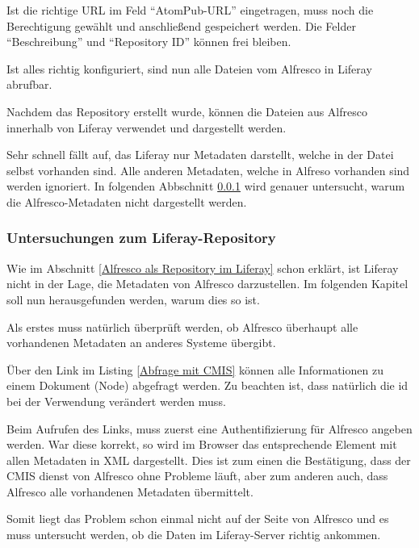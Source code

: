 Ist die richtige URL im Feld "`AtomPub-URL"' eingetragen, muss noch die Berechtigung gew\"ahlt und anschlie\ss{}end gespeichert werden. Die Felder "`Beschreibung"' und "`Repository ID"' k\"onnen frei bleiben.

Ist alles richtig konfiguriert, sind nun alle Dateien vom Alfresco in Liferay abrufbar. \cite{CMIS_Repo}

Nachdem das Repository erstellt wurde, k\"onnen die Dateien aus Alfresco innerhalb von Liferay verwendet und dargestellt werden.

Sehr schnell f\"allt auf, das Liferay nur Metadaten darstellt, welche in der Datei selbst vorhanden sind. Alle anderen Metadaten, welche in Alfreso vorhanden sind werden ignoriert. In folgenden Abbschnitt \ref{Untersuchungen zum Liferay-Repository} wird genauer untersucht, warum die Alfresco-Metadaten nicht dargestellt werden.

\subsubsection{Untersuchungen zum Liferay-Repository}\label{Untersuchungen zum Liferay-Repository}
Wie im Abschnitt \ref{Alfresco als Repository im Liferay} schon erkl\"art, ist Liferay nicht in der Lage, die Metadaten von Alfresco darzustellen. Im folgenden Kapitel soll nun herausgefunden werden, warum dies so ist.

Als erstes muss nat\"urlich \"uberpr\"uft werden, ob Alfresco \"uberhaupt alle vorhandenen Metadaten an anderes Systeme \"ubergibt.

\"Uber den Link im Listing \ref{Abfrage mit CMIS} k\"onnen alle Informationen zu einem Dokument (Node) abgefragt werden. Zu beachten ist, dass nat\"urlich die id bei der Verwendung ver\"andert werden muss. \cite{GetNodeInfo}



Beim Aufrufen des Links, muss zuerst eine Authentifizierung f\"ur Alfresco angeben werden. War diese korrekt, so wird im Browser das entsprechende Element mit allen Metadaten in XML dargestellt. Dies ist zum einen die Best\"atigung, dass der CMIS dienst von Alfresco ohne Probleme l\"auft, aber zum anderen auch, dass Alfresco alle vorhandenen Metadaten \"ubermittelt.

Somit liegt das Problem schon einmal nicht auf der Seite von Alfresco und es muss untersucht werden, ob die Daten im Liferay-Server richtig ankommen.

